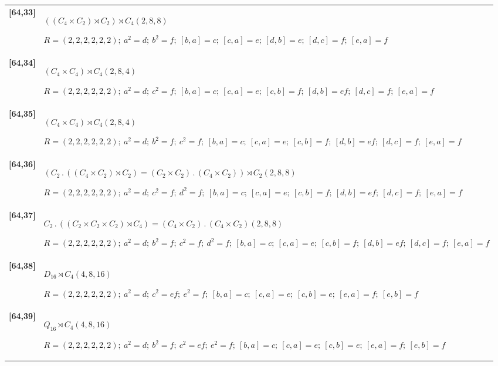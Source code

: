 \documentclass[UTF8,fontset=fandol,11pt,a4paper]{ctexart}
\begin{document}
\begin{longtable}{@{}p{17mm}>{\raggedright\arraybackslash}p{141mm}@{}}
\textbf{[64,33]} & $((C_{4}\times C_{2})\rtimes C_{2})\rtimes C_{4}$\quad $(2,8,8)$\par\(R=(2,2,2,2,2,2);\allowbreak\ a^{2}=d;\allowbreak\ b^{2}=f;\allowbreak\ [b,a]=c;\allowbreak\ [c,a]=e;\allowbreak\ [d,b]=e;\allowbreak\ [d,c]=f;\allowbreak\ [e,a]=f\)\\[3pt]

\textbf{[64,34]} & $(C_{4}\times C_{4})\rtimes C_{4}$\quad $(2,8,4)$\par\(R=(2,2,2,2,2,2);\allowbreak\ a^{2}=d;\allowbreak\ c^{2}=f;\allowbreak\ [b,a]=c;\allowbreak\ [c,a]=e;\allowbreak\ [c,b]=f;\allowbreak\ [d,b]=ef;\allowbreak\ [d,c]=f;\allowbreak\ [e,a]=f\)\\[3pt]

\textbf{[64,35]} & $(C_{4}\times C_{4})\rtimes C_{4}$\quad $(2,8,4)$\par\(R=(2,2,2,2,2,2);\allowbreak\ a^{2}=d;\allowbreak\ b^{2}=f;\allowbreak\ c^{2}=f;\allowbreak\ [b,a]=c;\allowbreak\ [c,a]=e;\allowbreak\ [c,b]=f;\allowbreak\ [d,b]=ef;\allowbreak\ [d,c]=f;\allowbreak\ [e,a]=f\)\\[3pt]

\textbf{[64,36]} & $(C_{2}\mathbin{.} ((C_{4}\times C_{2})\rtimes C_{2}) = (C_{2}\times C_{2})\mathbin{.} (C_{4}\times C_{2}))\rtimes C_{2}$\quad $(2,8,8)$\par\(R=(2,2,2,2,2,2);\allowbreak\ a^{2}=d;\allowbreak\ c^{2}=f;\allowbreak\ d^{2}=f;\allowbreak\ [b,a]=c;\allowbreak\ [c,a]=e;\allowbreak\ [c,b]=f;\allowbreak\ [d,b]=ef;\allowbreak\ [d,c]=f;\allowbreak\ [e,a]=f\)\\[3pt]

\textbf{[64,37]} & $C_{2}\mathbin{.} ((C_{2}\times C_{2}\times C_{2})\rtimes C_{4}) = (C_{4}\times C_{2})\mathbin{.} (C_{4}\times C_{2})$\quad $(2,8,8)$\par\(R=(2,2,2,2,2,2);\allowbreak\ a^{2}=d;\allowbreak\ b^{2}=f;\allowbreak\ c^{2}=f;\allowbreak\ d^{2}=f;\allowbreak\ [b,a]=c;\allowbreak\ [c,a]=e;\allowbreak\ [c,b]=f;\allowbreak\ [d,b]=ef;\allowbreak\ [d,c]=f;\allowbreak\ [e,a]=f\)\\[3pt]

\textbf{[64,38]} & $D_{16}\rtimes C_{4}$\quad $(4,8,16)$\par\(R=(2,2,2,2,2,2);\allowbreak\ a^{2}=d;\allowbreak\ c^{2}=ef;\allowbreak\ e^{2}=f;\allowbreak\ [b,a]=c;\allowbreak\ [c,a]=e;\allowbreak\ [c,b]=e;\allowbreak\ [e,a]=f;\allowbreak\ [e,b]=f\)\\[3pt]

\textbf{[64,39]} & $Q_{16}\rtimes C_{4}$\quad $(4,8,16)$\par\(R=(2,2,2,2,2,2);\allowbreak\ a^{2}=d;\allowbreak\ b^{2}=f;\allowbreak\ c^{2}=ef;\allowbreak\ e^{2}=f;\allowbreak\ [b,a]=c;\allowbreak\ [c,a]=e;\allowbreak\ [c,b]=e;\allowbreak\ [e,a]=f;\allowbreak\ [e,b]=f\)\\[3pt]


\end{longtable}
\end{document}
